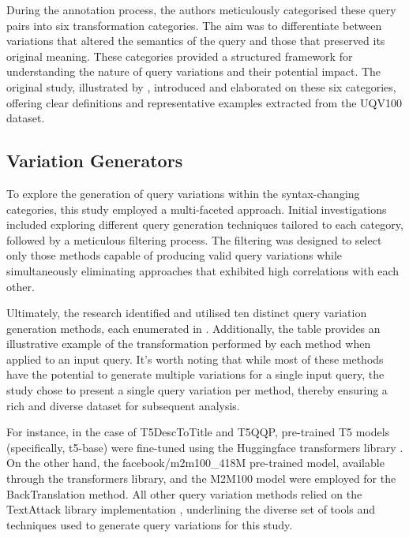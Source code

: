 During the annotation process, the authors meticulously categorised these query pairs into six transformation categories. The aim was to differentiate between variations that altered the semantics of the query and those that preserved its original meaning. These categories provided a structured framework for understanding the nature of query variations and their potential impact. The original study, illustrated by , introduced and elaborated on these six categories, offering clear definitions and representative examples extracted from the UQV100 dataset.



\subsection{Variation Generators}
To explore the generation of query variations within the syntax-changing categories, this study employed a multi-faceted approach. Initial investigations included exploring different query generation techniques tailored to each category, followed by a meticulous filtering process. The filtering was designed to select only those methods capable of producing valid query variations while simultaneously eliminating approaches that exhibited high correlations with each other.


Ultimately, the research identified and utilised ten distinct query variation generation methods, each enumerated in . Additionally, the table provides an illustrative example of the transformation performed by each method when applied to an input query. It's worth noting that while most of these methods have the potential to generate multiple variations for a single input query, the study chose to present a single query variation per method, thereby ensuring a rich and diverse dataset for subsequent analysis.

For instance, in the case of T5DescToTitle and T5QQP, pre-trained T5 models (specifically, t5-base) were fine-tuned using the Huggingface transformers library \cite{hugging}. On the other hand, the facebook/m2m100\_418M pre-trained model, available through the transformers library, and the M2M100 model \cite{translation} were employed for the BackTranslation method. All other query variation methods relied on the TextAttack library implementation \cite{textattack}, underlining the diverse set of tools and techniques used to generate query variations for this study.

